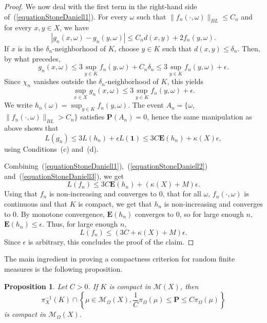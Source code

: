 \documentclass{amsart}
\newtheorem{prop}[thm]{Proposition}
\theoremstyle{definition}
\theoremstyle{remark}
\begin{document}
\begin{proof}
We now deal with the first term in the right-hand side of~(\ref{equationStoneDaniell1}).
For every $\omega$ such that $\|f_n(\cdot,\omega)\|_{BL}\leq C_n$ and for every $x,y\in X$, we have
$$|g_n(x,\omega)-g_n(y,\omega)|\leq C_nd(x,y)+2f_n(y,\omega).$$
If $x$ is in the $\delta_n$-neighborhood of $K$, choose $y\in K$ such that
$d(x,y)\leq \delta_n$.
Then, by what precedes,
$$g_n(x,\omega)\leq 3\sup_{y\in K}f_n(y,\omega)+C_n\delta_n\leq 3\sup_{y\in K}f_n(y,\omega)+\epsilon.$$
Since $\chi_n$ vanishes outside the $\delta_n$-neighborhood of $K$, this yields
$$\sup_{x\in X}g_n(x,\omega)\leq 3\sup_{y\in K}f_n(y,\omega)+\epsilon.$$
We write $h_n(\omega)=\sup_{y\in K}f_n(y,\omega)$.
The event $A_n= \{\omega$, $\|f_n(\cdot,\omega)\|_{BL}>C_n\}$ satisfies $\mathbf P(A_n)=0$, hence the same manipulation as above shows that
\begin{equation}\label{equationStoneDaniell3}
L(g_n)\leq 3L(h_n)+\epsilon L(\mathbf 1)\leq 3C\mathbf E(h_n)+\kappa(X)\epsilon,
\end{equation}
using Conditions~(c) and~(d).

Combining~(\ref{equationStoneDaniell1}),~(\ref{equationStoneDaniell2}) and~(\ref{equationStoneDaniell3}), we get
$$L(f_n)\leq 3C\mathbf E(h_n)+(\kappa(X)+M)\epsilon.$$
Using that $f_n$ is non-increasing and converges to 0, that for all $\omega$, $f_n(\cdot,\omega)$ is continuous and that $K$ is compact, we get that $h_n$ is non-increasing and converges to 0.
By monotone convergence, $\mathbf E(h_n)$ converges to 0,
so for large enough $n$, $\mathbf E(h_n)\leq \epsilon$.
Thus, for large enough $n$,
$$L(f_n)\leq (3C+\kappa(X)+M)\epsilon.$$
Since $\epsilon$ is arbitrary, this concludes the proof of the claim.
\end{proof}

The main ingredient in proving a compactness criterion for random finite measures is the following proposition.

\begin{prop}
Let $C>0$.
If $K$ is compact in $\mathcal{M}(X)$, then
$$\pi_X^{-1}(K)\cap \left \{\mu \in \mathcal{M}_\Omega(X), \frac{1}{C}\pi_\Omega(\mu)\leq \mathbf P\leq C\pi_\Omega(\mu)\right \}$$ is compact in $\mathcal{M}_\Omega(X)$.
\end{prop}
\end{document}

